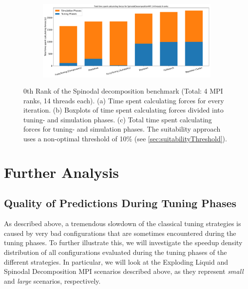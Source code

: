 \begin{figure}[H]
    \begin{subfigure}[b]{\textwidth}
        \includegraphics[width=\columnwidth,trim={0cm 0.5cm 0cm 0.9cm},clip]{figures/Benchmark/SpinodalDecompositionMPI/SpinodalDecompositionMPI_timings_total_SpinodalDecompositionMPI_14_0.png}
        \caption{}
        \label{fig:spinodalTotalTime_14thread}
    \end{subfigure}


    \caption[Benchmark Results for the Spinodal Decomposition MPI Scenario]{0th Rank of the Spinodal decomposition benchmark (Total: 4 MPI ranks, 14 threads each). (a) Time spent calculating forces for every iteration. (b) Boxplots of time spent calculating forces divided into tuning- and simulation phases. (c) Total time spent calculating forces for tuning- and simulation phases. The suitability approach uses a non-optimal threshold of 10\% (see \autoref{sec:suitabilityThreshold}).}
    \label{fig:spinodal_14thread}
\end{figure}



\section{Further Analysis}

\subsection{Quality of Predictions During Tuning Phases}

As described above, a tremendous slowdown of the classical tuning strategies is caused by very bad configurations that are sometimes encountered during the tuning phases. To further illustrate this, we will investigate the speedup density distribution of all configurations evaluated during the tuning phases of the different strategies. In particular, we will look at the Exploding Liquid and Spinodal Decomposition MPI scenarios described above, as they represent \emph{small} and \emph{large} scenarios, respectively.

